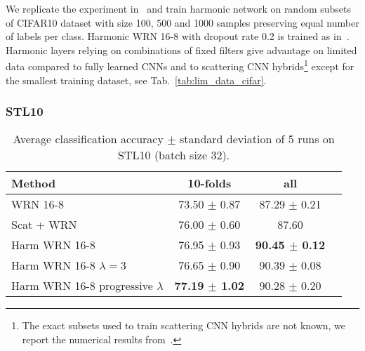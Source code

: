 \documentclass[conference]{IEEEtran}
\begin{document}
We replicate the experiment in~\cite{Oyallon18} and train harmonic network on random subsets of CIFAR10 dataset with size 100, 500 and 1000 samples preserving equal number of labels per class. Harmonic WRN 16-8 with dropout rate 0.2 is trained as in~\cite{Oyallon18}. Harmonic layers relying on combinations of fixed filters give advantage on limited data compared to fully learned CNNs and to scattering CNN hybrids\footnote{The exact subsets used to train scattering CNN hybrids are not known, we report the numerical results from~\cite{Oyallon18}.} except for the smallest training dataset, see Tab.~\ref{tab:lim_data_cifar}. 

\subsubsection{STL10}

\begin{table}
\centering
\caption{Average classification accuracy $\pm$ standard deviation of 5 runs on STL10 (batch size 32).} \label{tab:stl}
\begin{tabular}{|l|c|c|c|}
 \hline
 \textbf{Method} & \textbf{10-folds} & \textbf{all} \\
 \hline
 WRN 16-8 & 73.50 $\pm$ 0.87 & 87.29 $\pm$ 0.21 \\
 Scat + WRN~\cite{Oyallon18} & 76.00 $\pm$ 0.60 & \hspace{-1.04cm} 87.60  \\
 Harm WRN 16-8 & 76.95 $\pm$ 0.93 & \textbf{90.45 $\pm$ 0.12} \\
 Harm WRN 16-8 $\lambda=3$ & 76.65 $\pm$ 0.90 & 90.39 $\pm$ 0.08 \\
 Harm WRN 16-8 progressive $\lambda$ & \textbf{77.19 $\pm$ 1.02} & 90.28 $\pm$ 0.20 \\
 \hline
\end{tabular}
\end{table}
\end{document}
